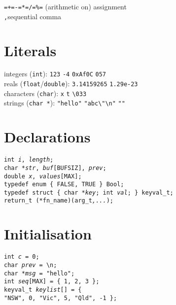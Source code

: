 \documentclass[8pt]{article}
\newcommand{\Cc}[1]{\texttt{#1}}
\newcommand{\kw}[1]{\textcolor{black!40!lime}{\texttt{#1}}} %
\newcommand{\ty}[1]{\textcolor{blue!80}{\texttt{#1}}} %
\newcommand{\kv}[1]{\textcolor{red!40!black}{\texttt{#1}}} %
\newcommand{\val}[1]{\texttt{#1}} %
\newcommand{\quo}[1]{\textcolor{violet!80!black}{\texttt{#1}}} %
\newcommand{\quot}[1]{\quo{"#1"}} %
\newcommand{\fn}[1]{\texttt{#1}} %
\newcommand{\var}[1]{\texttt{\textit{#1}}} %
\newcommand{\opt}[1]{\textrm{\textit{#1}}} %
\newcommand{\htab}{\hspace*{2em}} %
\newcommand{\Cq}{\textquotesingle} %
\newcommand{\Cx}{\textbackslash} %
\begin{document}
\begin{multicols}{3}
\Cc{=}\quad\Cc{+=}\quad\Cc{-=}\quad\Cc{*=}\quad\Cc{/=}\quad\Cc{\%=} \hfill
    (arithmetic on) assignment \\
\Cc{,}\quad sequential comma

\section*{Literals}

integers (\ty{int}):\hfill
    \val{123}\quad
    \val{-4}\quad 
    \val{0xAf0C}\quad 
    \val{057}\\
reals (\ty{float}/\ty{double}):\hfill
    \val{3.14159265}\quad
    \val{1.29e-23}\\
characters (\ty{char}):\hfill
    \val{\Cq x\Cq}\quad
    \val{\Cq t\Cq}
    \val{\Cq\Cx033\Cq}\\
strings (\ty{char *}):\hfill
    \quot{hello}\quad
    \quot{abc\Cx"\Cx n}\quad
    \quot{}


\section*{Declarations}

\Cc{\ty{int} \var{i}, \var{length}; \\
\ty{char *}\var{str}, \var{buf}[\kv{BUFSIZ}], \var{prev}; \\
\ty{double} \var{x}, \var{values}[\kv{MAX}]; \\
\kw{typedef} \ty{enum} \{ \kv{FALSE}, \kv{TRUE} \} \ty{Bool}; \\
\kw{typedef} \ty{struct} \{ \ty{char *}\var{key}; \ty{int} \var{val}; \} \ty{keyval\_t}; \\
\ty{return\_t} (*\fn{fn\_name})(\ty{arg\_t}\opt{,...});}

\section*{Initialisation}

\Cc{\ty{int} \var{c} = \val{0}; \\
\ty{char} \var{prev} = \val{\Cq\Cx n\Cq}; \\
\ty{char *}\var{msg} = \quot{hello}; \\
\ty{int} \var{seq}[\kv{MAX}] = \{ \val{1}, \val{2}, \val{3} \}; \\
\ty{keyval\_t} \var{keylist}[] = \{ \\
\htab\quot{NSW}, \val{0},  \quot{Vic}, \val{5},   \quot{Qld}, \val{-1} \}; }


\end{multicols}
\end{document}
